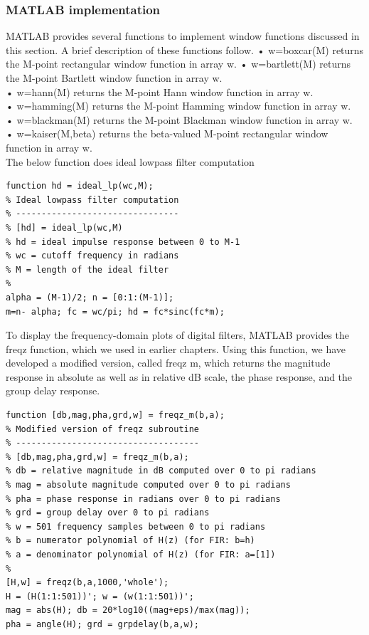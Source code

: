 \documentclass{article}
\begin{document}
\subsubsection{MATLAB implementation}
MATLAB provides several functions to implement window functions discussed in this section. A brief description of these functions follow.
• w=boxcar(M) returns the M-point rectangular window function in
array w.
• w=bartlett(M) returns the M-point Bartlett window function in
array w. \\
• w=hann(M) returns the M-point Hann window function in array w.\\
• w=hamming(M) returns the M-point Hamming window function in
array w. \\
• w=blackman(M) returns the M-point Blackman window function in
array w. \\
• w=kaiser(M,beta) returns the beta-valued M-point rectangular
window function in array w. \\
\vspace{1em}
The below function does ideal lowpass filter computation
\begin{lstlisting}
function hd = ideal_lp(wc,M);
% Ideal lowpass filter computation
% --------------------------------
% [hd] = ideal_lp(wc,M)
% hd = ideal impulse response between 0 to M-1
% wc = cutoff frequency in radians
% M = length of the ideal filter
%
alpha = (M-1)/2; n = [0:1:(M-1)];
m=n- alpha; fc = wc/pi; hd = fc*sinc(fc*m);
\end{lstlisting}
To display the frequency-domain plots of digital filters, MATLAB
provides the freqz function, which we used in earlier chapters. Using this
function, we have developed a modified version, called freqz m, which
returns the magnitude response in absolute as well as in relative dB scale,
the phase response, and the group delay response.
\begin{lstlisting}
function [db,mag,pha,grd,w] = freqz_m(b,a);
% Modified version of freqz subroutine
% ------------------------------------
% [db,mag,pha,grd,w] = freqz_m(b,a);
% db = relative magnitude in dB computed over 0 to pi radians
% mag = absolute magnitude computed over 0 to pi radians
% pha = phase response in radians over 0 to pi radians
% grd = group delay over 0 to pi radians
% w = 501 frequency samples between 0 to pi radians
% b = numerator polynomial of H(z) (for FIR: b=h)
% a = denominator polynomial of H(z) (for FIR: a=[1])
%
[H,w] = freqz(b,a,1000,'whole');
H = (H(1:1:501))'; w = (w(1:1:501))';
mag = abs(H); db = 20*log10((mag+eps)/max(mag));
pha = angle(H); grd = grpdelay(b,a,w);    
\end{lstlisting}
\end{document}

